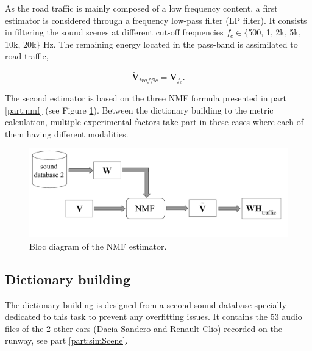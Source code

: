 \documentclass[review,5p,twocolumn,sort&compress,times]{elsarticle}
\begin{document}
As the road traffic is mainly composed of a low frequency content, a first estimator is considered through a frequency low-pass filter (LP filter). It consists in filtering the sound scenes at different cut-off frequencies $f_c \in \lbrace$500, 1, 2k, 5k, 10k, 20k$\rbrace$ Hz. The remaining energy located in the pass-band is assimilated to road traffic,

\begin{equation}
\mathbf{\tilde{V}}_{traffic} = \mathbf{V}_{f_c}.
\end{equation}

The second estimator is based on the three NMF formula presented in part \ref{part:nmf} (see Figure \ref{fig:bloc_diagram_nmf}). Between the dictionary building to the metric calculation, multiple experimental factors take part in these cases where each of them having different modalities.

\begin{figure}[t]
\centering
\includegraphics[width=.9\linewidth]{figures/bloc_diagram_NMF_EN_2.pdf}
\caption{Bloc diagram of the NMF estimator.}
\label{fig:bloc_diagram_nmf}
\end{figure}

\subsection{Dictionary building}\label{part:dictionary_building}
The dictionary building is designed from a second sound database specially dedicated to this task to prevent any overfitting issues. It contains the 53 audio files of the 2 other cars (Dacia Sandero and Renault Clio) recorded on the runway, see part \ref{part:simScene}.
\end{document}
